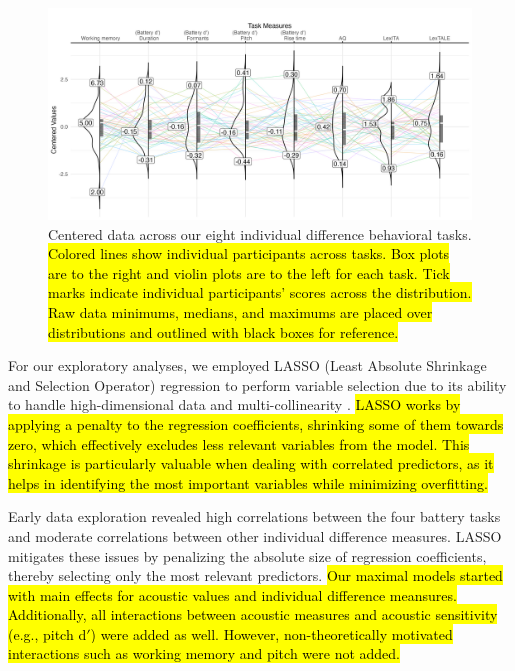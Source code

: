 \begin{figure}[H]
  \centering
  \includegraphics[width=1\linewidth]{visuals/plot_raw_task.jpeg}
  \caption{Centered data across our eight individual difference behavioral tasks. \hl{Colored lines show individual participants across tasks. Box plots are to the right and violin plots are to the left for each task. Tick marks indicate individual participants' scores across the distribution. Raw data minimums, medians, and maximums are placed over distributions and outlined with black boxes for reference.}}
  \label{fig:plot_raw_task}
\end{figure}


For our exploratory analyses, we employed LASSO (Least Absolute Shrinkage and Selection Operator) regression to perform variable selection due to its ability to handle high-dimensional data and multi-collinearity \citep{Zhang2020, Tibshirani1996}. \hl{LASSO works by applying a penalty to the regression coefficients, shrinking some of them towards zero, which effectively excludes less relevant variables from the model. This shrinkage is particularly valuable when dealing with correlated predictors, as it helps in identifying the most important variables while minimizing overfitting.}

Early data exploration revealed high correlations between the four battery tasks and moderate correlations between other individual difference measures. LASSO mitigates these issues by penalizing the absolute size of regression coefficients, thereby selecting only the most relevant predictors. \hl{Our maximal models started with main effects for acoustic values and individual difference meansures. Additionally, all interactions between acoustic measures and acoustic sensitivity (e.g., pitch d$'$) were added as well. However, non-theoretically motivated interactions such as working memory and pitch were not added.}

